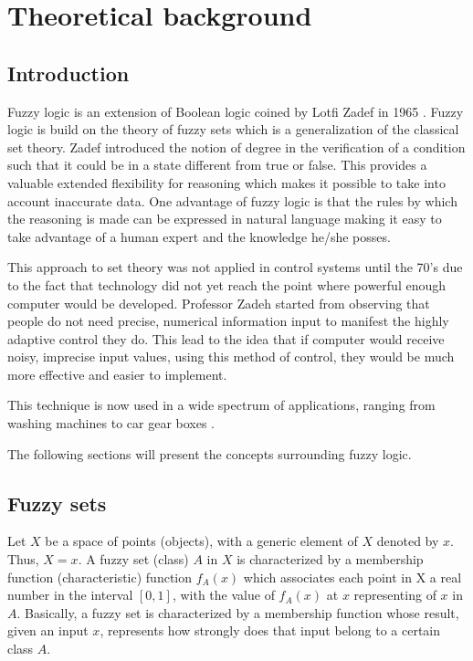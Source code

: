 \chapter{Theoretical background}
\label{chap:theoretical_brackground}

\section{Introduction}

\qquad Fuzzy logic is an extension of Boolean logic coined by Lotfi Zadef in 1965 \cite{FuzzySets}
\cite{FuzzySets_NewApproach} \cite{FuzzySets_Algo}. Fuzzy logic is build on the theory of fuzzy sets which is
a generalization of the classical set theory. Zadef introduced the notion of degree in the verification of a
condition such that it could be in a state different from true or false. This provides a valuable extended
flexibility for reasoning which makes it possible to take into account inaccurate data. One advantage of fuzzy
logic is that the rules by which the reasoning is made can be expressed in natural language making it easy to
take advantage of a human expert and the knowledge he/she posses.

\qquad This approach to set theory was not applied in control systems until the 70's due to the fact that technology
did not yet reach the point where powerful enough computer would be developed. Professor Zadeh started from
observing that people do not need precise, numerical information input to manifest the highly adaptive control
they do. This lead to the idea that if computer would receive noisy, imprecise input values, using this
method of control, they would be much more effective and easier to implement.

\qquad This technique is now used in a wide spectrum of applications, ranging from washing machines to car gear
boxes \cite{INT:INT4550030208}.

The following sections will present the concepts surrounding fuzzy logic.

\section{Fuzzy sets}
\label{sec:fuzzy_sets}

\qquad Let $X$ be a space of points (objects), with a generic element of $X$ denoted by $x$. Thus, $X = {x}$.
A fuzzy set (class) $A$ in $X$ is characterized by a membership function (characteristic) function $f_{A}(x)$
which associates each point in X a real number in the interval $[0, 1]$, with the value of $f_{A}(x)$ at $x$
representing  of $x$ in $A$. \cite{Fuzyy_Sets}
Basically, a fuzzy set is characterized by a membership function whose result, given an input $x$, represents
how strongly does that input belong to a certain class $A$.

